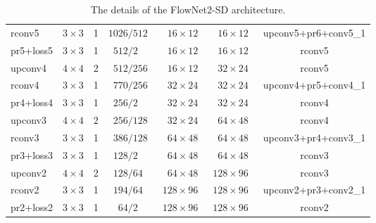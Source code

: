 \documentclass[10pt,twocolumn,letterpaper]{article}%
\newcommand{\pz}{\phantom{0}}%
\begin{document}
\begin{table}
\begin{center}
{\begin{tabular}{|l|ccc|cc|c|}
      rconv5    & $3\!\times\!3$ & 1 & $1026/512\pz$  & $16\!\times\!12$   & $16\!\times\!12$   & upconv5+pr6+conv5\_1 \\
      pr5+loss5 & $3\!\times\!3$ & 1 & $512/2\pz\pz$     & $16\!\times\!12$   & $16\!\times\!12$   & rconv5 \\
      upconv4   & $4\!\times\!4$ & 2 & $512/256$   & $16\!\times\!12$   & $32\!\times\!24$   & rconv5 \\
      rconv4    & $3\!\times\!3$ & 1 & $770/256$   & $32\!\times\!24$   & $32\!\times\!24$   & upconv4+pr5+conv4\_1 \\
      pr4+loss4 & $3\!\times\!3$ & 1 & $256/2\pz\pz$     & $32\!\times\!24$   & $32\!\times\!24$   & rconv4 \\
      upconv3   & $4\!\times\!4$ & 2 & $256/128$   & $32\!\times\!24$   & $64\!\times\!48$   & rconv4 \\
      rconv3    & $3\!\times\!3$ & 1 & $386/128$   & $64\!\times\!48$   & $64\!\times\!48$   & upconv3+pr4+conv3\_1 \\
      pr3+loss3 & $3\!\times\!3$ & 1 & $128/2\pz\pz$     & $64\!\times\!48$   & $64\!\times\!48$   & rconv3 \\
      upconv2   & $4\!\times\!4$ & 2 & $128/64\pz$    & $64\!\times\!48$   & $128\!\times\!96\pz$  & rconv3 \\
      rconv2    & $3\!\times\!3$ & 1 & $194/64\pz$    & $128\!\times\!96\pz$  & $128\!\times\!96\pz$  & upconv2+pr3+conv2\_1 \\
      pr2+loss2 & $3\!\times\!3$ & 1 & $64/2\pz$      & $128\!\times\!96\pz$  & $128\!\times\!96\pz$  & rconv2 \\
      \hline
    \end{tabular}}
  \end{center}
  \caption{The details of the FlowNet2-SD architecture.}
  \label{table:sd_net}
\end{table}
\end{document}
